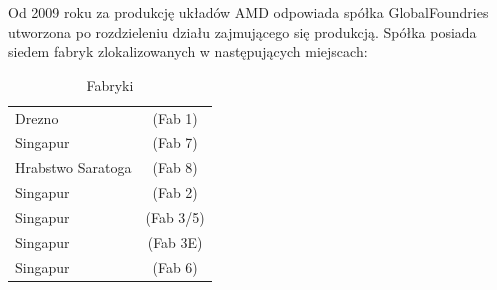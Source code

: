 \documentclass[a4paper,12pt]{article}
\begin{document}
Od 2009 roku za produkcję układów AMD odpowiada spółka GlobalFoundries utworzona po rozdzieleniu działu zajmującego się produkcją. Spółka posiada siedem fabryk zlokalizowanych w następujących miejscach:

\begin{table}[h]
\centering \caption{Fabryki}
\begin{tabular}{lc}
\hline
Drezno&(Fab 1)\\
Singapur&(Fab 7)\\
Hrabstwo Saratoga&(Fab 8)\\
Singapur&(Fab 2)\\
Singapur&(Fab 3/5)\\
Singapur&(Fab 3E)\\
Singapur&(Fab 6)\\

\end{tabular}
\end{table}
\end{document}
